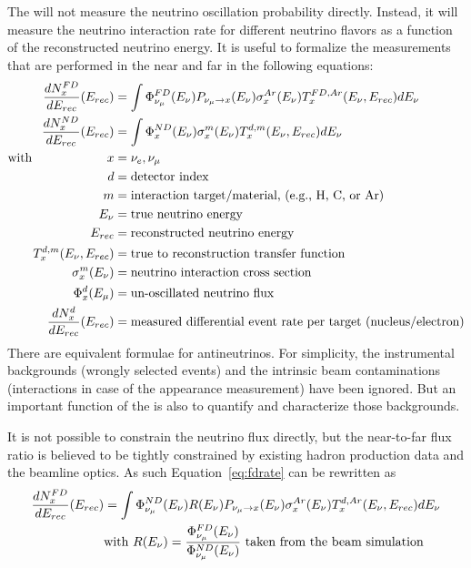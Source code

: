 The    will not measure the neutrino oscillation probability directly. Instead, it will measure the neutrino interaction rate for different neutrino flavors as a function of the reconstructed neutrino energy. It is useful to formalize the measurements that are performed in the near and  far  in the following equations:
\begin{align}
\label{eq:fdrate}
\frac{dN^{FD}_{x}}{dE_{rec}}(E_{rec}) & = 
\int \Phi^{FD}_{\nu_\mu}(E_\nu)P_{\nu_\mu\rightarrow x}(E_\nu)\sigma^{Ar}_x(E_\nu)T^{FD,Ar}_x(E_\nu,E_{rec})dE_\nu\\
\frac{dN^{ND}_{x}}{dE_{rec}}(E_{rec}) & = 
\int \Phi^{ND}_{x}(E_\nu)\sigma^m_x(E_\nu)T^{d,m}_x(E_\nu,E_{rec})dE_\nu\\
\mbox{with\hspace{2cm} } x & = \nu_e , \nu_\mu \nonumber \\
d & = \mbox{detector index} \nonumber \\
m & = \mbox{interaction target/material, (e.g., H, C, or Ar)} \nonumber \\
E_\nu & = \mbox{true neutrino energy} \nonumber \\
E_{rec} & = \mbox{reconstructed neutrino energy} \nonumber \\
T^{d,m}_x(E_\nu,E_{rec}) & = \mbox{true to reconstruction transfer function} \nonumber \\
\sigma^m_x(E_\nu) & = \mbox{neutrino interaction cross section} \nonumber \\
\Phi^{d}_x(E_\mu) & = \mbox{un-oscillated neutrino flux} \nonumber \\
\frac{dN^{d}_{x}}{dE_{rec}}(E_{rec}) & = \mbox{measured differential event rate per target (nucleus/electron)} \nonumber 
\end{align}
There are equivalent formulae for antineutrinos. For simplicity, the instrumental backgrounds (wrongly selected events) and the intrinsic beam contaminations (\nue interactions in case of the appearance measurement) have been ignored. But an important function of the   is also to quantify and characterize those backgrounds.

It is not possible to constrain the  neutrino flux directly, but the near-to-far flux ratio is believed to be tightly constrained by existing hadron production data and the beamline optics. As such Equation~\ref{eq:fdrate} can be rewritten as 
\begin{align*}
\frac{dN^{FD}_{x}}{dE_{rec}}(E_{rec}) & = 
\int \Phi^{ND}_{\nu_\mu}(E_\nu)R(E_\nu)P_{\nu_\mu\rightarrow x}(E_\nu)\sigma^{Ar}_x(E_\nu)T^{d,Ar}_x(E_\nu,E_{rec})dE_\nu\\
& \mbox{with } R(E_\nu) = \frac{\Phi^{FD}_{\nu_\mu}(E_\nu)}{\Phi^{ND}_{\nu_\mu}(E_\nu)} \mbox{ taken from the beam simulation} \nonumber
\end{align*}

